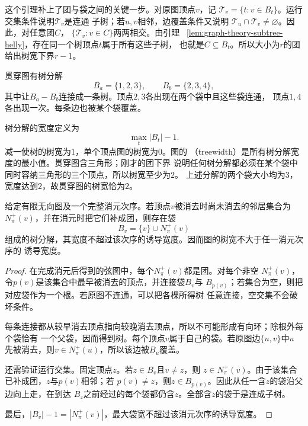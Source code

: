 这个引理补上了团与袋之间的关键一步。对原图顶点\(v\)，记
\(\mathcal{T}_v=\{t:v\in B_t\}\)。运行交集条件说明\(\mathcal{T}_v\)是连通
子树；若\(u,v\)相邻，边覆盖条件又说明
\(\mathcal{T}_u\cap\mathcal{T}_v\neq\varnothing\)。因此，对任意团\(C\)，
\(\{\mathcal{T}_v:v\in C\}\)两两相交。由引理
~\ref{lem:graph-theory-subtree-helly}，存在同一个树顶点\(t\)属于所有这些子树，
也就是\(C\subseteq B_t\)。所以大小为\(r\)的团给出树宽下界\(r-1\)。

贯穿图有树分解
\[
  B_a=\{1,2,3\},\qquad B_b=\{2,3,4\},
\]
其中让\(B_a-B_b\)连接成一条树。顶点\(2,3\)各出现在两个袋中且这些袋连通，
顶点\(1,4\)各出现一次。每条边也被某个袋覆盖。

树分解的宽度定义为
\[
  \max_{t}|B_t|-1.
\]
减一使树的树宽为\(1\)，单个顶点图的树宽为\(0\)。图的
（treewidth）是所有树分解宽度的最小值。贯穿图含三角形；刚才的团下界
说明任何树分解都必须在某个袋中同时容纳三角形的三个顶点，所以树宽至少为\(2\)。
上述分解的两个袋大小均为\(3\)，宽度达到\(2\)，故贯穿图的树宽恰为\(2\)。

\begin{theorem}[消元序产生树分解]
  \label{thm:graph-theory-elimination-tree-decomposition}
  给定有限无向图及一个完整消元次序。若顶点\(v\)被消去时尚未消去的邻居集合为
  \(N^+_{\pi}(v)\)，并在消元时把它们补成团，则存在袋
  \[
    B_v=\{v\}\cup N^+_{\pi}(v)
  \]
  组成的树分解，其宽度不超过该次序的诱导宽度。因而图的树宽不大于任一消元次序的
  诱导宽度。
\end{theorem}

\begin{proof}
在完成消元后得到的弦图中，每个\(N^+_{\pi}(v)\)都是团。对每个非空
\(N^+_{\pi}(v)\)，令\(p(v)\)是该集合中最早被消去的顶点，并连接袋\(B_v\)与
\(B_{p(v)}\)；若集合为空，则把对应袋作为一个根。若原图不连通，可以把各棵所得树
任意连接，空交集不会破坏条件。

每条连接都从较早消去顶点指向较晚消去顶点，所以不可能形成有向环；除根外每个袋恰有
一个父袋，因而得到树。每个顶点\(v\)属于自己的袋。若原图边\(\{u,v\}\)中\(u\)
先被消去，则\(v\in N^+_{\pi}(u)\)，所以该边被\(B_u\)覆盖。

还需验证运行交集。固定顶点\(z\)。若\(z\in B_v\)且\(v\neq z\)，则
\(z\in N^+_{\pi}(v)\)。由于该集合已补成团，\(z\)与\(p(v)\)相邻；若
\(p(v)\neq z\)，则\(z\in B_{p(v)}\)。因此从任一含\(z\)的袋沿父边向上走，在到达
\(B_z\)之前经过的每个袋都仍含\(z\)。全部含\(z\)的袋于是连成子树。

最后，\(|B_v|-1=|N^+_{\pi}(v)|\)，最大袋宽不超过该消元次序的诱导宽度。
\end{proof}

